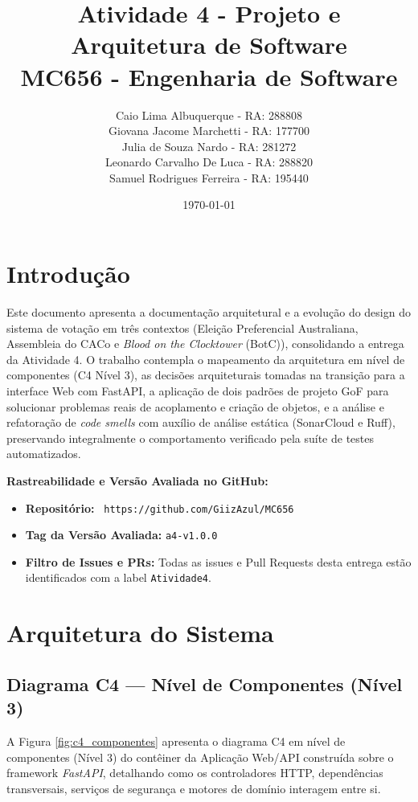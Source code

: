 \documentclass[12pt,a4paper]{article}
\title{\textbf{Atividade 4 - Projeto e Arquitetura de Software}\\
\large MC656 - Engenharia de Software}
\author{
  Caio Lima Albuquerque - RA: 288808 \\
  Giovana Jacome Marchetti - RA: 177700 \\
  Julia de Souza Nardo - RA: 281272 \\
  Leonardo Carvalho De Luca - RA: 288820\\
  Samuel Rodrigues Ferreira - RA: 195440
}
\date{\today}
\begin{document}
\maketitle

\section{Introdução}
Este documento apresenta a documentação arquitetural e a evolução do design do sistema de votação em três contextos (Eleição Preferencial Australiana, Assembleia do CACo e \textit{Blood on the Clocktower} (BotC)), consolidando a entrega da Atividade 4. O trabalho contempla o mapeamento da arquitetura em nível de componentes (C4 Nível 3), as decisões arquiteturais tomadas na transição para a interface Web com FastAPI, a aplicação de dois padrões de projeto GoF para solucionar problemas reais de acoplamento e criação de objetos, e a análise e refatoração de \textit{code smells} com auxílio de análise estática (SonarCloud e Ruff), preservando integralmente o comportamento verificado pela suíte de testes automatizados. \newline


\textbf{Rastreabilidade e Versão Avaliada no GitHub:}
\begin{itemize}
    \item \textbf{Repositório:} \href{https://github.com/GiizAzul/MC656}\faGithub\texttt{ https://github.com/GiizAzul/MC656}
    \item \textbf{Tag da Versão Avaliada:} \texttt{a4-v1.0.0}
    \item \textbf{Filtro de Issues e PRs:} Todas as issues e Pull Requests desta entrega estão identificados com a label \texttt{Atividade4}.
\end{itemize}

\section{Arquitetura do Sistema}

\subsection{Diagrama C4 --- Nível de Componentes (Nível 3)}
A Figura \ref{fig:c4_componentes} apresenta o diagrama C4 em nível de componentes (Nível 3) do contêiner da Aplicação Web/API construída sobre o framework \textit{FastAPI}, detalhando como os controladores HTTP, dependências transversais, serviços de segurança e motores de domínio interagem entre si.
\end{document}
